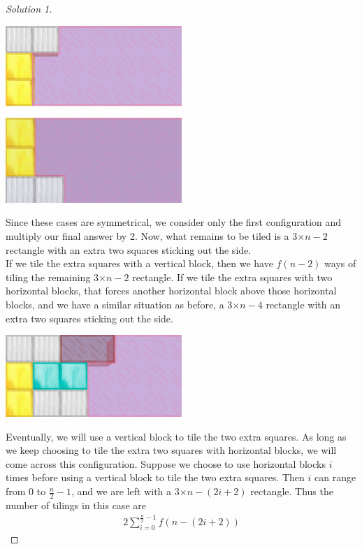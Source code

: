 \documentclass[12pt]{article}
\begin{document}
\begin{myprob}{}{}
\begin{proof}[Solution 1]
            \begin{center}
                \includegraphics[width=0.5\textwidth]{Fig6.png}
            \end{center}

            Since these cases are symmetrical, we consider only the first configuration and multiply our final answer by 2. Now, what remains to be tiled is a 3$\times n-2$ rectangle with an extra two squares sticking out the side.\\
            
            If we tile the extra squares with a vertical block, then we have $f(n-2)$ ways of tiling the remaining 3$\times n-2$ rectangle. If we tile the extra squares with two horizontal blocks, that forces another horizontal block above those horizontal blocks, and we have a similar situation as before, a 3$\times n-4$ rectangle with an extra two squares sticking out the side.
            
            \begin{center}
                \includegraphics[width=0.5\textwidth]{Fig7.png}
            \end{center}

            Eventually, we will use a vertical block to tile the two extra squares. As long as we keep choosing to tile the extra two squares with horizontal blocks, we will come across this configuration. Suppose we choose to use horizontal blocks $i$ times before using a vertical block to tile the two extra squares. Then $i$ can range from $0$ to $\frac{n}{2}-1$, and we are left with a 3$\times n-(2i+2)$ rectangle. Thus the number of tilings in this case are
            \begin{align*}
                2\sum_{i=0}^{\frac{n}{2}-1}f(n-(2i+2))
            \end{align*}


\end{proof}
\end{myprob}
\end{document}
